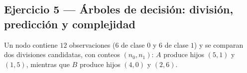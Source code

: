 \subsection{Ejercicio 5 --- Árboles de decisión: división, predicción y complejidad}

Un nodo contiene $12$ observaciones ($6$ de clase $0$ y $6$ de clase
$1$) y se comparan dos divisiones candidatas, con conteos $(n_0,n_1)$:
$A$ produce hijos $(5,1)$ y $(1,5)$, mientras que $B$ produce hijos
$(4,0)$ y $(2,6)$.

